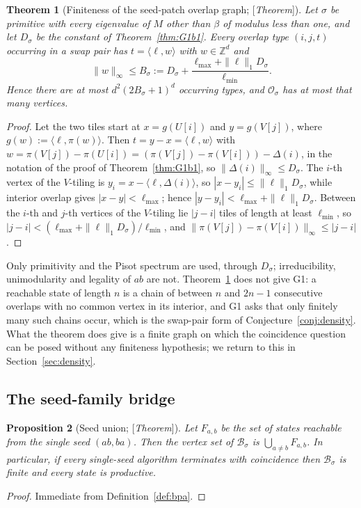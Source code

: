 \documentclass[11pt]{amsart}
\theoremstyle{plain}
\newtheorem{theorem}{Theorem}[section]
\newtheorem{proposition}[theorem]{Proposition}
\theoremstyle{definition}
\theoremstyle{remark}
\newcommand{\Z}{\mathbb{Z}}
\newcommand{\B}{\mathcal{B}}
\newcommand{\Status}[1]{\textup{[\textit{#1}]}}
\begin{document}
\begin{theorem}[Finiteness of the seed-patch overlap graph; \Status{Theorem}]\label{thm:overlap-finite}
Let $\sigma$ be primitive with every eigenvalue of $M$ other than $\beta$ of modulus less than one, and let $D_\sigma$ be the constant of Theorem~\ref{thm:G1b1}. Every overlap type $(i,j,t)$ occurring in a swap pair has $t=\langle\ell,w\rangle$ with $w\in\Z^d$ and
\[\|w\|_\infty\le B_\sigma:=D_\sigma+\frac{\ell_{\max}+\|\ell\|_1D_\sigma}{\ell_{\min}}.\]
Hence there are at most $d^2(2B_\sigma+1)^d$ occurring types, and $\mathcal O_\sigma$ has at most that many vertices.
\end{theorem}
\begin{proof}
Let the two tiles start at $x=g(U[i])$ and $y=g(V[j])$, where $g(w):=\langle\ell,\pi(w)\rangle$. Then $t=y-x=\langle\ell,w\rangle$ with $w=\pi(V[j])-\pi(U[i])=(\pi(V[j])-\pi(V[i]))-\Delta(i)$, in the notation of the proof of Theorem~\ref{thm:G1b1}, so $\|\Delta(i)\|_\infty\le D_\sigma$. The $i$-th vertex of the $V$-tiling is $y_i=x-\langle\ell,\Delta(i)\rangle$, so $|x-y_i|\le\|\ell\|_1D_\sigma$, while interior overlap gives $|x-y|<\ell_{\max}$; hence $|y-y_i|<\ell_{\max}+\|\ell\|_1D_\sigma$. Between the $i$-th and $j$-th vertices of the $V$-tiling lie $|j-i|$ tiles of length at least $\ell_{\min}$, so $|j-i|<(\ell_{\max}+\|\ell\|_1D_\sigma)/\ell_{\min}$, and $\|\pi(V[j])-\pi(V[i])\|_\infty\le|j-i|$.
\end{proof}

Only primitivity and the Pisot spectrum are used, through $D_\sigma$; irreducibility, unimodularity and legality of $ab$ are not. Theorem~\ref{thm:overlap-finite} does not give G1: a reachable state of length $n$ is a chain of between $n$ and $2n-1$ consecutive overlaps with no common vertex in its interior, and G1 asks that only finitely many such chains occur, which is the swap-pair form of Conjecture~\ref{conj:density}. What the theorem does give is a finite graph on which the coincidence question can be posed without any finiteness hypothesis; we return to this in Section~\ref{sec:density}.

\subsection{The seed-family bridge}\label{sec:literature-bridge}

\begin{proposition}[Seed union; \Status{Theorem}]\label{prop:seed-union}
Let $F_{a,b}$ be the set of states reachable from the single seed $(ab,ba)$. Then the vertex set of $\B_\sigma$ is $\bigcup_{a\ne b}F_{a,b}$. In particular, if every single-seed algorithm terminates with coincidence then $\B_\sigma$ is finite and every state is productive.
\end{proposition}
\begin{proof}
Immediate from Definition~\ref{def:bpa}.
\end{proof}
\end{document}
